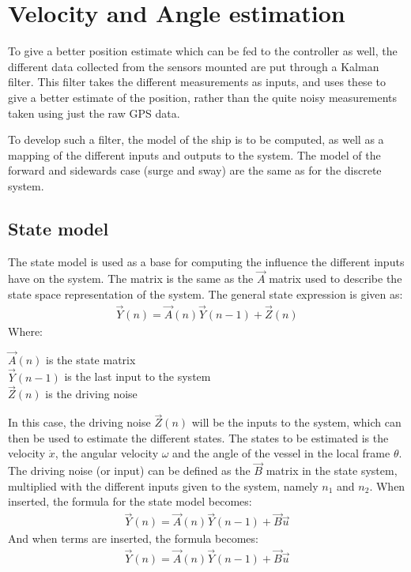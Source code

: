 \section{Velocity and Angle estimation}
To give a better position estimate which can be fed to the controller as well, the different data collected from the sensors mounted are put through a Kalman filter. This filter takes the different measurements as inputs, and uses these to give a better estimate of the position, rather than the quite noisy measurements taken using just the raw \ac{GPS} data. 

To develop such a filter, the model of the ship is to be computed, as well as a mapping of the different inputs and outputs to the system. The model of the forward and sidewards case (surge and sway) are the same as for the discrete system. 

\subsection{State model}
The state model is used as a base for computing the influence the different inputs have on the system. The matrix is the same as the $\vec{A}$ matrix used to describe the state space representation of the system. The general state expression is given as:
\begin{align}
\vec{Y}(n) = \vec{A}(n)\vec{Y}(n-1) + \vec{Z}(n)
\end{align}
\noindent Where:
\begin{ffk}
$\vec{A}(n)$ is the state matrix\\
$\vec{Y}(n-1)$ is the last input to the system\\
$\vec{Z}(n)$ is the driving noise
\end{ffk}
In this case, the driving noise $\vec{Z}(n)$ will be the inputs to the system, which can then be used to estimate the different states. The states to be estimated is the velocity $\dot{x}$, the angular velocity $\omega$ and the angle of the vessel in the local frame $\theta$. The driving noise (or input) can be defined as the $\vec{B}$ matrix in the state system, multiplied with the different inputs given to the system, namely $n_1$ and $n_2$. When inserted, the formula for the state model becomes:
\begin{align}
\vec{Y}(n) = \vec{A}(n)\vec{Y}(n-1) + \vec{B}\vec{u}
\end{align}
And when terms are inserted, the formula becomes: 
\begin{align}
\vec{Y}(n) = \vec{A}(n)\vec{Y}(n-1) + \vec{B}\vec{u}
\end{align}

